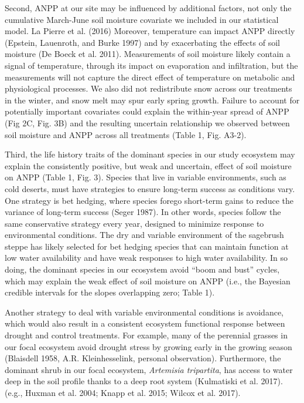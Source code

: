 \documentclass[fleqn,10pt,lineno]{wlpeerj} %
\begin{document}
Second, ANPP at our site may be influenced by additional factors, not
only the cumulative March-June soil moisture covariate we included in
our statistical model.  La Pierre et al. (2016)
Moreover, temperature can impact ANPP directly (Epstein, Lauenroth, and
Burke 1997) and by exacerbating the effects of soil moisture (De Boeck
et al. 2011). Measurements of soil moisture likely contain a signal of
temperature, through its impact on evaporation and infiltration, but the
measurements will not capture the direct effect of temperature on
metabolic and physiological processes. We also did not redistribute snow
across our treatments in the winter, and snow melt may spur early spring
growth. Failure to account for potentially important covariates could
explain the within-year spread of ANPP (Fig 2C, Fig. 3B) and the
resulting uncertain relationship we observed between soil moisture and
ANPP across all treatments (Table 1, Fig. A3-2).

Third, the life history traits of the dominant species in our study
ecosystem may explain the consistently positive, but weak and uncertain,
effect of soil moisture on ANPP (Table 1, Fig. 3). Species that live in
variable environments, such as cold deserts, must have strategies to
ensure long-term success as conditions vary. One strategy is bet
hedging, where species forego short-term gains to reduce the variance of
long-term success (Seger 1987). In other words, species follow the same
conservative strategy every year, designed to minimize response to
environmental conditions. The dry and variable environment of the
sagebrush steppe has likely selected for bet hedging species that can
maintain function at low water availability and have weak responses to
high water availability. In so doing, the dominant species in our
ecosystem avoid ``boom and bust'' cycles, which may explain the weak
effect of soil moisture on ANPP (i.e., the Bayesian credible intervals
for the slopes overlapping zero; Table 1).

Another strategy to deal with variable environmental conditions is
avoidance, which would also result in a consistent ecosystem functional
response between drought and control treatments. For example, many of
the perennial grasses in our focal ecosystem avoid drought stress by
growing early in the growing season (Blaisdell 1958, A.R.
Kleinhesselink, personal observation). Furthermore, the dominant shrub
in our focal ecosystem, \emph{Artemisia tripartita}, has access to water
deep in the soil profile thanks to a deep root system (Kulmatiski et al.
2017).
(e.g., Huxman et al. 2004; Knapp et al. 2015; Wilcox et al. 2017).
\end{document}
